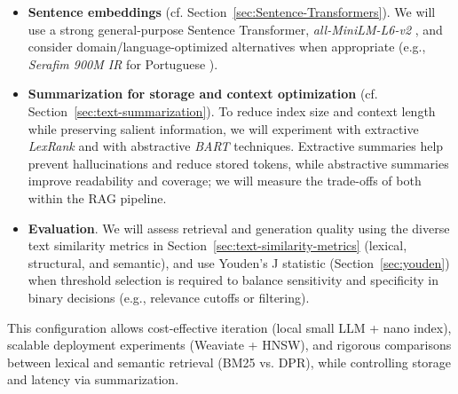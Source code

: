 \begin{itemize}
    \item \textbf{Sentence embeddings} (cf. Section~\ref{sec:Sentence-Transformers}). We will use a strong general-purpose Sentence Transformer, \emph{all-MiniLM-L6-v2} \cite{reimers2019sentence}, and consider domain/language-optimized alternatives when appropriate (e.g., \emph{Serafim 900M IR} for Portuguese \cite{gomes2024opensentenceembeddingsportuguese}).

    \item \textbf{Summarization for storage and context optimization} (cf. Section~\ref{sec:text-summarization}). To reduce index size and context length while preserving salient information, we will experiment with extractive \emph{LexRank} and with abstractive \emph{BART} techniques. Extractive summaries help prevent hallucinations and reduce stored tokens, while abstractive summaries improve readability and coverage; we will measure the trade-offs of both within the \gls{RAG} pipeline.

    \item \textbf{Evaluation}. We will assess retrieval and generation quality using the diverse text similarity metrics in Section~\ref{sec:text-similarity-metrics} (lexical, structural, and semantic), and use Youden's J statistic (Section~\ref{sec:youden}) when threshold selection is required to balance sensitivity and specificity in binary decisions (e.g., relevance cutoffs or filtering).
\end{itemize}



This configuration allows cost-effective iteration (local small \gls{LLM} + nano index), scalable deployment experiments (Weaviate + HNSW), and rigorous comparisons between lexical and semantic retrieval (BM25 vs. DPR), while controlling storage and latency via summarization.






